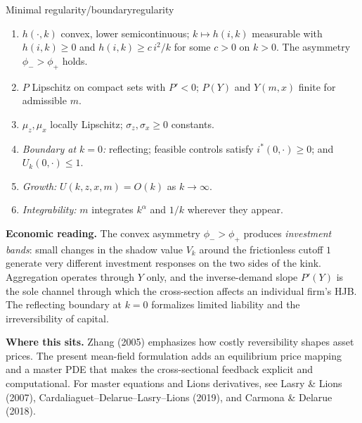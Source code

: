 \documentclass[11pt,letterpaper,oneside]{article}
\numberwithin{equation}{section}
\newcommand{\1}{\mathbf{1}}
\begin{document}
\begin{assumption}{Minimal regularity/boundary}{regularity}
\begin{enumerate}[label=(\alph*),itemsep=0.2em]
\item $h(\cdot,k)$ convex, lower semicontinuous; $k\mapsto h(i,k)$ measurable with $h(i,k)\ge 0$ and $h(i,k)\ge c\,i^2/k$ for some $c>0$ on $k>0$. The asymmetry $\phi_->\phi_+$ holds.
\item $P$ Lipschitz on compact sets with $P'<0$; $P(Y)$ and $Y(m,x)$ finite for admissible $m$.
\item $\mu_z,\mu_x$ locally Lipschitz; $\sigma_z,\sigma_x\ge 0$ constants.
\item \emph{Boundary at $k=0$:} reflecting; feasible controls satisfy $i^*(0,\cdot)\ge 0$; and $U_k(0,\cdot)\le 1$.
\item \emph{Growth:} $U(k,z,x,m)=O(k)$ as $k\to\infty$.
\item \emph{Integrability:} $m$ integrates $k^\alpha$ and $1/k$ wherever they appear.
\end{enumerate}
\end{assumption}

\begin{tcolorbox}[didacticstyle]
\textbf{Economic reading.} The convex asymmetry $\phi_->\phi_+$ produces \emph{investment bands}: small changes in the shadow value $V_k$ around the frictionless cutoff $1$ generate very different investment responses on the two sides of the kink. Aggregation operates through $Y$ only, and the inverse-demand slope $P'(Y)$ is the sole channel through which the cross-section affects an individual firm's HJB. The reflecting boundary at $k=0$ formalizes limited liability and the irreversibility of capital.
\end{tcolorbox}


\begin{tcolorbox}[literaturestyle]
\textbf{Where this sits.} Zhang (2005) emphasizes how costly reversibility shapes asset prices. The present mean-field formulation adds an equilibrium price mapping and a master PDE that makes the cross-sectional feedback explicit and computational. For master equations and Lions derivatives, see Lasry \& Lions (2007), Cardaliaguet--Delarue--Lasry--Lions (2019), and Carmona \& Delarue (2018).
\end{tcolorbox}

\end{document}
